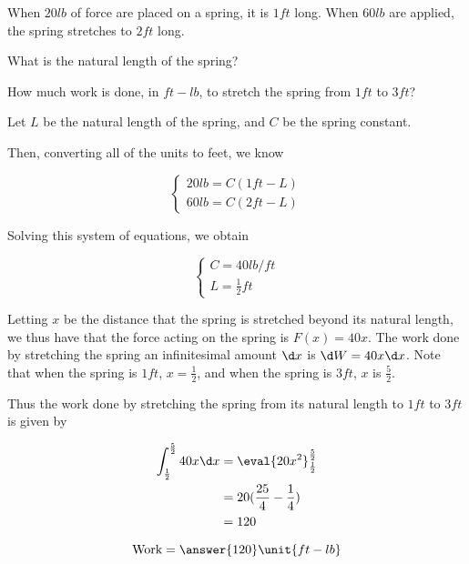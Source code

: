 \documentclass{ximera}
\author{Steven Gubkin}
\begin{document}
\begin{exercise}


When $20 \unit{lb}$ of force are placed on a spring, it is $1 \unit{ft}$ long.  When $60 \unit{lb}$ are applied, the spring stretches to $2 \unit{ft}$ long.

What is the natural length of the spring?

How much work is done, in $\unit{ft - lb}$, to stretch the spring from $1 \unit{ft}$ to $3 \unit{ft}$? 

\begin{hint}
Let $L$ be the natural length of the spring, and $C$ be the spring constant.  

Then, converting all of the units to feet, we know

\[
\begin{cases}
20 \unit{lb} = C(1\unit{ft} - L)\\
60 \unit{lb}= C(2 \unit{ft}- L)
\end{cases}
\]

Solving this system of equations, we obtain

\[
\begin{cases}
C = 40 \unit{lb}/\unit{ft}\\
L = \frac{1}{2} \unit{ft}
\end{cases}
\]
\end{hint}

\begin{hint}
	Letting $x$ be the distance that the spring is stretched beyond its natural length, we thus have that the force acting on the spring is $F(x) = 40x$.  The work done by stretching the spring an infinitesimal amount $\d x$ is $\d W = 40x\d x$.  Note that when the spring is $1 \unit{ft}$, $x = \frac{1}{2}$, and when the spring is $3 \unit{ft}$, $x$ is $\frac{5}{2}$.
\end{hint}

\begin{hint}
Thus the work done by stretching the spring from its natural length to $1 \unit{ft}$ to $3 \unit{ft}$ is given by

\begin{align*}
\int_{\frac{1}{2}}^{\frac{5}{2}} 40 x \d x &= \eval{20x^2}_{\frac{1}{2}}^\frac{5}{2}\\
	&=20(\frac{25}{4} - \frac{1}{4})\\
	&=120
\end{align*}
\end{hint}

\begin{prompt}
	\[
	\textrm{Work} = \answer{120} \unit{ft-lb}
	\]
\end{prompt}

\end{exercise}
\end{document}
